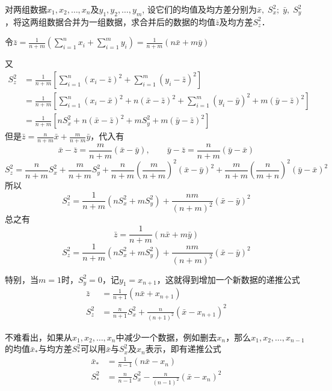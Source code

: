 \begin{example}
    对两组数据$x_1,x_2,\ldots,x_n$及$y_1,y_2,\ldots,y_m$, 设它们的均值及均方差分别为$\bar x,\; S^2_x; \; \bar y,\;  S^2_y$，将这两组数据合并为一组数据，求合并后的数据的均值$\bar z$及均方差$S^2_z$．
\end{example}

\begin{solution}
令$\bar z=\frac{1}{n+m}\left(\sum\limits^n_{i=1}x_i+\sum\limits^m_{i=1}y_i\right)=\frac{1}{n+m}(n\bar x+m\bar y)$

又
\[\begin{split}
    S^2_z&=\frac{1}{n+m}\left[\sum\limits^n_{i=1}(x_i-\bar z)^2+\sum\limits^m_{i=1}(y_i-\bar z)^2\right]\\
    &=\frac{1}{n+m}\left[\sum\limits^n_{i=1}(x_i-\bar x)^2 +n(\bar x-\bar z)^2+\sum\limits^m_{i=1}(y_i-\bar y)^2+m(\bar y-\bar z)^2\right]\\
    &=\frac{1}{n+m}\left[nS^2_x+n(\bar x-\bar z)^2+mS^2_y+m(\bar y-\bar z)^2\right]
\end{split}\]
但是$\bar z=\frac{n}{n+m}\bar x+\frac{m}{n+m}\bar y$，代入有
\[\bar x-\bar z=\frac{m}{n+m}(\bar x-\bar y),\qquad \bar y-\bar z=\frac{n}{n+m}(\bar y-\bar x)\]
\[S_{z}^{2}= \frac n{n+ m} S_{x}^{2}+ \frac m{n+ m} S_{y}^{2}+ \frac n{n+ m}\left(\frac m{n+ m}\right)^{2}(\bar x- \bar{y} ) ^{2}+\frac{m}{n+m}\left(\frac{n}{m+n}\right)^{2}(\bar{y}-\bar x)^{2}\]
所以
\[S_{z}^{2}=\frac{1}{n+m}\left(nS_{x}^{2}+mS_{y}^{2}\right)+\frac{nm}{(n+m)^{2}}(\bar{x}-\bar{y})^2\]
总之有
$$\bar z=\frac{1}{n+m}(n\bar{x}+m\bar{y})$$
\[S_{z}^{2}=\frac{1}{n+m}\left(nS_{x}^{2}+mS_{y}^{2}\right)+\frac{nm}{(n+m)^{2}}(\bar{x}-\bar{y})^2\]
\end{solution}

特别，当$m=1$时，$S^2_y=0$，记$y_1=x_{n+1}$，这就得到增加一个新数据的递推公式
\[\begin{split}
    \bar z&= \frac{1}{n+1}(n\bar x+x_{n+1})\\
    S^2_z&=\frac{n}{n+1}S^2_x+\frac{n}{(n+1)^2}(\bar x-x_{n+1})^2
\end{split}\]

不难看出，如果从$x_1,x_2,\ldots,x_n$中减少一个数据，例如删去$x_n$，那么$x_1,x_2,\ldots,x_{n-1}$的均值$\bar x_{*}$与均方差$S^2_{*}$可以用$\bar x$与$S^2_x$及$x_n$表示，即有递推公式
\[\begin{split}
    \bar x_{*}&= \frac{1}{n-1}(n\bar x-x_{n})\\
    S^2_{*}&=\frac{n}{n-1}S^2_x-\frac{n}{(n-1)^2}(\bar x-x_{n})^2
\end{split}\]

